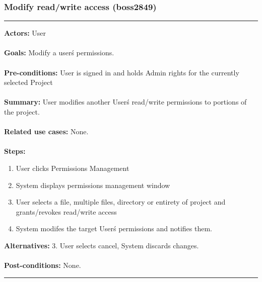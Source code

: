 \documentclass[11pt]{report}
\begin{document}
\subsubsection{Modify read/write access (boss2849)}
\vspace{2pt}
\hrule
\vspace{8pt}
 \textbf{Actors:} User \\ \\
\textbf{Goals:} Modify a user\'s permissions. \\ \\
 \textbf{Pre-conditions:} User is signed in and holds Admin rights for the currently selected Project\\ \\
 \textbf{Summary:} User modifies another User\'s read/write permissions to portions of the project. \\ \\
 \textbf{Related use cases:} None. \\ \\
\textbf{Steps:} \begin{enumerate}
  \item User clicks Permissions Management
  \item System displays permissions management window
  \item User selects a file, multiple files, directory or entirety of project and grants/revokes read/write access
  \item System modifes the target User\'s permissions and notifies them.
 \end{enumerate}
 \textbf{Alternatives:} 3. User selects cancel, System discards changes. \\ \\
 \textbf{Post-conditions:} None. \\
\vspace{8pt}
\hrule
\newpage
\end{document}
